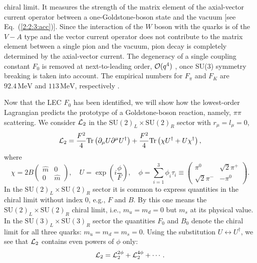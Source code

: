 \documentclass[twoside,12pt]{article}
\begin{document}
chiral limit.
   It measures the strength of the matrix element of the axial-vector
current operator between a one-Goldstone-boson state and the vacuum
[see Eq.\ (\ref{2:2:3:acc})].
   Since the interaction of the $W$ boson with the quarks is of the
$V-A$ type and the vector current operator does not contribute to the
matrix element between a single pion and the vacuum, pion decay
is completely determined by the axial-vector current.
   The degeneracy of a single coupling constant $F_0$ is removed at
next-to-leading order, ${\cal O}(q^4)$ \cite{Gasser:1984gg},
once SU(3) symmetry breaking is taken into account.
   The empirical numbers for $F_\pi$ and $F_K$ are
$92.4\,\mbox{MeV}$ and $113\,\mbox{MeV}$, respectively
\cite{PDG_2008}.

   Now that the LEC $F_0$ has been identified, we will show
how the lowest-order Lagrangian predicts the prototype of a
Goldstone-boson reaction, namely, $\pi\pi$ scattering.
   We consider ${\cal L}_2$ in the $\mbox{SU}(2)_L\times\mbox{SU}(2)_R$
sector with $r_\mu=l_\mu=0$,
\begin{displaymath}
{\cal L}_2=\frac{F^2}{4}\mbox{Tr} \left(\partial_\mu U
\partial^\mu U^\dagger\right) +\frac{F^2}{4}\mbox{Tr}\left(\chi
U^\dagger+ U \chi^\dagger\right),
\end{displaymath}
where
\begin{displaymath}
\chi=2B\left(\!\!\begin{array}{cc} \hat m &0\\0&\hat
m\end{array} \!\!\right),\quad
U=\exp\left(i\frac{\phi}{F}\right),\quad \phi=\sum_{i=1}^3  \phi_i \tau_i
\equiv\left(\begin{array}{cc}
\pi^0 &\sqrt{2}\pi^+\\
\sqrt{2}\pi^-&-\pi^0
\end{array}\right).
\end{displaymath}
   In the $\mbox{SU}(2)_L\times\mbox{SU}(2)_R$ sector it is common to express quantities in
the chiral limit without index 0, e.g., $F$ and $B$. By this one
means the $\mbox{SU}(2)_L\times\mbox{SU}(2)_R$ chiral limit, i.e., $m_u=m_d=0$ but $m_s$ at its
physical value.
   In the $\mbox{SU}(3)_L\times\mbox{SU}(3)_R$  sector the quantities $F_0$ and $B_0$
denote the chiral limit for all three quarks: $m_u=m_d=m_s=0$.
   Using the substitution $U\leftrightarrow U^\dagger$, we see that
${\cal L}_2$ contains even powers of $\phi$ only:
\begin{displaymath}
{\cal L}_2= {\cal L}_2^{2\phi} +{\cal L}_2^{4\phi} +\cdots.
\end{displaymath}
\end{document}
